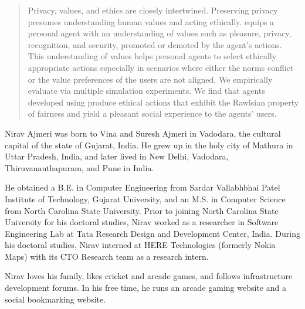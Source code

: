 \begin{abstract}
Privacy, values, and ethics are closely intertwined. Preserving privacy presumes  understanding human values and acting ethically. \frameworkAinur equips a personal agent with an understanding of values such as pleasure, privacy, recognition, and security, promoted or demoted by the agent's actions. This understanding of values helps personal agents to select ethically appropriate actions especially in scenarios where either the norms conflict or the value preferences of the users are not aligned.  We empirically evaluate \frameworkAinur via multiple simulation experiments. We find that agents developed using \frameworkAinur produce ethical actions that exhibit the Rawlsian property of fairness and yield a pleasant social experience to the agents' users.
\end{abstract}


\makecopyrightpage

\maketitlepage

\begin{dedication}
  \centering 
\end{dedication}

\begin{biography}
Nirav Ajmeri was born to Vina and Suresh Ajmeri in Vadodara, the cultural capital of the state of Gujarat, India. He grew up in the holy city of Mathura in Uttar Pradesh, India, and later lived in New Delhi, Vadodara, Thiruvananthapuram, and Pune in India. 

He obtained a B.E. in Computer Engineering from Sardar Vallabhbhai Patel Institute of Technology, Gujarat University, 
and an M.S. in Computer Science from North Carolina State University. 
Prior to joining North Carolina State University for his doctoral studies, Nirav worked as a researcher in Software Engineering Lab at Tata Research Design and Development Center, India. During his doctoral studies, Nirav interned at HERE Technologies (formerly Nokia Maps) with its CTO Research team as a research intern. 

Nirav loves his family, likes cricket and arcade games, and follows infrastructure development forums. 
In his free time, he runs an arcade gaming website and a social bookmarking website. 
\end{biography}

